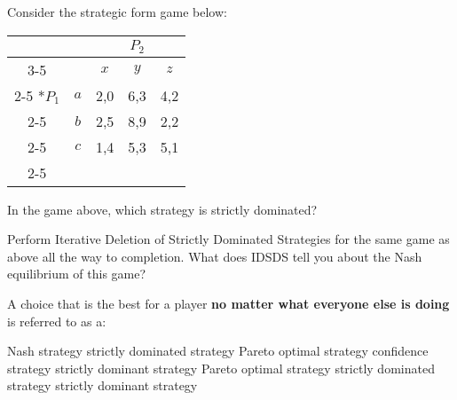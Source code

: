   \begin{question}
  Consider the strategic form game below:
  \begin{table}[h!]
    \begin{center}
    \setlength{\extrarowheight}{2pt}
    \begin{tabular}{*{5}{c|}}
      \multicolumn{2}{c}{} & \multicolumn{3}{c}{$P_2$} \\\cline{3-5}
      \multicolumn{1}{c}{} &     & $x$ & $y$ & $z$ \\\cline{2-5}
      \multirow{3}*{$P_1$}  & $a$ & 2,0 & 6,3 & 4,2 \\\cline{2-5}
                            & $b$ & 2,5 & 8,9 & 2,2 \\\cline{2-5}
                            & $c$ & 1,4 & 5,3 & 5,1 \\\cline{2-5}
    \end{tabular}
    \end{center}
  \end{table}
  
  In the game above, which strategy is strictly dominated?
  
  \begin{tasks}
    \task {}
    \task {}
    \task {}
    \task {}
    \task {}
  \end{tasks}
\end{question}

  \begin{question} 
  Perform Iterative Deletion of Strictly Dominated Strategies for the same game as above all the way to completion.
  What does IDSDS tell you about the Nash equilibrium of this game?
  \begin{tasks}
    \task {}
    \task {}
    \task {}
    \task {}
    \task {}
  \end{tasks}
\end{question}

\begin{question}
  A choice that is the best for a player \textbf{no matter what everyone else is doing}
  is referred to as a:
  \begin{tasks}
    \task \vary
    {Nash strategy}
    {strictly dominated strategy}
    \task \vary
    {Pareto optimal strategy}
    {confidence strategy}
    \task \vary
    {\correct strictly dominant strategy}
    {Pareto optimal strategy}
    \task \vary
    {strictly dominated strategy}
    {\correct strictly dominant strategy}
  \end{tasks}
\end{question}

